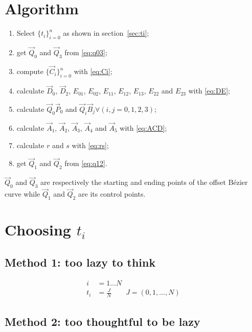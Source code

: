\documentclass{scrartcl}
\newcommand\V[1]{\vec{#1}}
\begin{document}
\section{Algorithm}

\begin{enumerate}
    \item Select $\{t_i\}_{i=0}^n$ as shown in section~\ref{sec:ti};
    \item get $\V{Q}_0$ and $\V{Q}_3$ from \eqref{eq:q03};
    \item compute $\{\V{C}_i\}_{i=0}^n$ with \eqref{eq:Ci};
    \item calculate $\V{D}_0$, $\V{D}_2$, $E_{01}$, $E_{02}$, $E_{11}$,
	$E_{12}$, $E_{13}$, $E_{22}$ and $E_{23}$ with \eqref{eq:DE};
    \item calculate $\V{Q}_0 \V{P}_0$ and $\V{Q}_i \V{B}_j \forall (i,j =
	0,1,2,3)$;
    \item calculate $\V{A}_1$, $\V{A}_2$, $\V{A}_3$, $\V{A}_4$ and $\V{A}_5$ with
	\eqref{eq:ACD};
    \item calculate $r$ and $s$ with \eqref{eq:rs};
    \item get $\V{Q}_1$ and $\V{Q}_2$ from \eqref{eq:q12}.
\end{enumerate}

$\V{Q}_0$ and $\V{Q}_3$ are respectively the starting and ending
points of the offset Bézier curve while $\V{Q}_1$ and $\V{Q}_2$ are
its control points.

\section{Choosing $t_i$\label{sec:ti}}

\subsection{Method 1: too lazy to think}

\begin{equation*}
\begin{split}
    i &= 1 \dots N\\
    t_i &= \frac{J}{N} \qquad J = (0, 1, \dots, N)
\end{split}
\end{equation*}

\subsection{Method 2: too thoughtful to be lazy}
\end{document}
